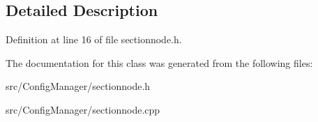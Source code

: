 \subsection{Detailed Description}


Definition at line 16 of file sectionnode.\+h.



The documentation for this class was generated from the following files\+:\begin{DoxyCompactItemize}
\item 
src/\+Config\+Manager/sectionnode.\+h\item 
src/\+Config\+Manager/sectionnode.\+cpp\end{DoxyCompactItemize}
